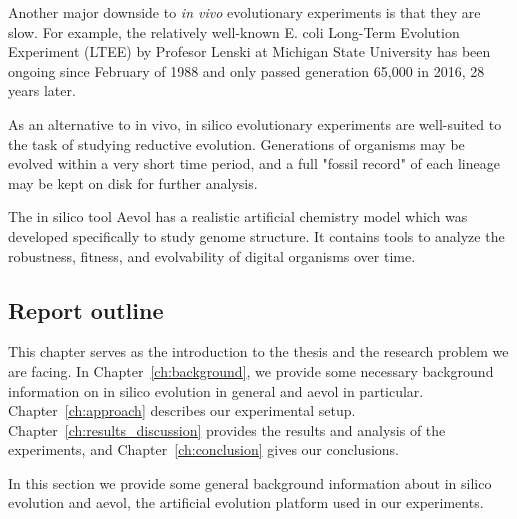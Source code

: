 Another major downside to \textit{in vivo} evolutionary experiments is that they are slow. For example, the relatively well-known E. coli Long-Term Evolution Experiment (LTEE) by Profesor Lenski at Michigan State University has been ongoing since February of 1988 and only passed generation 65,000 in 2016, 28 years later. 

As an alternative to in vivo, in silico evolutionary experiments are well-suited to the task of studying reductive evolution. Generations of organisms may be evolved within a very short time period, and a full "fossil record" of each lineage may be kept on disk for further analysis. 

The in silico tool Aevol has a realistic artificial chemistry model which was developed specifically to study genome structure. It contains tools to analyze the robustness, fitness, and evolvability of digital organisms over time. 

\subsection{Report outline}
This chapter serves as the introduction to the thesis and the research problem we are facing. In Chapter~\ref{ch:background}, we provide some necessary background information on in silico evolution in general and aevol in particular. Chapter~\ref{ch:approach} describes our experimental setup. Chapter~\ref{ch:results_discussion}
provides the results and analysis of the experiments, and Chapter~\ref{ch:conclusion} gives our conclusions. 

In this section we provide some general background information about in silico evolution and aevol, the artificial evolution platform used in our experiments. 

